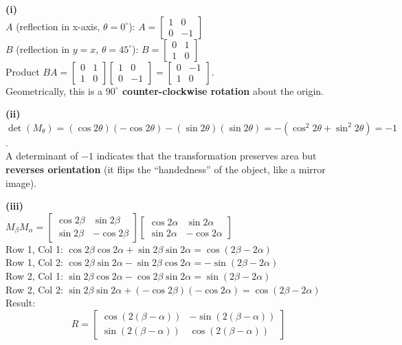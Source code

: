 \begin{solution}
\textbf{(i)} \\
$A$ (reflection in x-axis, $\theta=0^\circ$): $A = \begin{bmatrix} 1 & 0 \\ 0 & -1 \end{bmatrix}$ \\
$B$ (reflection in $y=x$, $\theta=45^\circ$): $B = \begin{bmatrix} 0 & 1 \\ 1 & 0 \end{bmatrix}$ \\
Product $BA = \begin{bmatrix} 0 & 1 \\ 1 & 0 \end{bmatrix} \begin{bmatrix} 1 & 0 \\ 0 & -1 \end{bmatrix} = \begin{bmatrix} 0 & -1 \\ 1 & 0 \end{bmatrix}$. \\
Geometrically, this is a \textbf{$90^\circ$ counter-clockwise rotation} about the origin.

\medskip
\textbf{(ii)} \\
$\det(M_\theta) = (\cos 2\theta)(-\cos 2\theta) - (\sin 2\theta)(\sin 2\theta) = -(\cos^2 2\theta + \sin^2 2\theta) = -1$. \\
A determinant of $-1$ indicates that the transformation preserves area but \textbf{reverses orientation} (it flips the ``handedness'' of the object, like a mirror image).

\medskip
\textbf{(iii)} \\
$M_\beta M_\alpha = \begin{bmatrix} \cos 2\beta & \sin 2\beta \\ \sin 2\beta & -\cos 2\beta \end{bmatrix} \begin{bmatrix} \cos 2\alpha & \sin 2\alpha \\ \sin 2\alpha & -\cos 2\alpha \end{bmatrix}$ \\
Row 1, Col 1: $\cos 2\beta \cos 2\alpha + \sin 2\beta \sin 2\alpha = \cos(2\beta - 2\alpha)$ \\
Row 1, Col 2: $\cos 2\beta \sin 2\alpha - \sin 2\beta \cos 2\alpha = -\sin(2\beta - 2\alpha)$ \\
Row 2, Col 1: $\sin 2\beta \cos 2\alpha - \cos 2\beta \sin 2\alpha = \sin(2\beta - 2\alpha)$ \\
Row 2, Col 2: $\sin 2\beta \sin 2\alpha + (-\cos 2\beta)(-\cos 2\alpha) = \cos(2\beta - 2\alpha)$ \\
Result: 
\[
R = \begin{bmatrix} \cos(2(\beta - \alpha)) & -\sin(2(\beta - \alpha)) \\ \sin(2(\beta - \alpha)) & \cos(2(\beta - \alpha)) \end{bmatrix}
\]


\end{solution}
